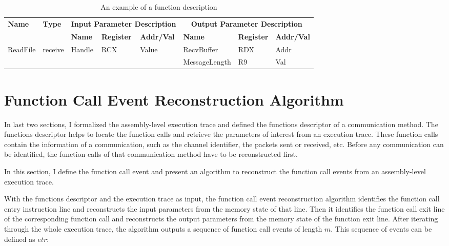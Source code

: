 \begin{table}[H]
        \centering
        \caption{An example of a function description}
        \label{functionexample}
        \begin{tabular}{|l|l|l|l|l|l|l|l|}
            \hline
             \multirow{2}{*}{{\textbf{Name}}} & \multirow{2}{*}{{\textbf{Type}}} & \multicolumn{3}{c|}{\textbf{Input Parameter Description}} & \multicolumn{3}{c|}{\textbf{Output Parameter Description}} \\
              \cline{3-8} 
             & & \textbf{Name}& \textbf{Register} &  \textbf{Addr/Val} & \textbf{Name}& \textbf{Register} &  \textbf{Addr/Val}  \\
             \hline
             \multirow{2}{*}{ReadFile}
             &\multirow{2}{*}{receive} &  \multirow{2}{*}{Handle} & \multirow{2}{*}{RCX} & \multirow{2}{*}{Value} & RecvBuffer & RDX  & Addr\\
              \cline{6-8} 
             & & & & & MessageLength & R9  & Val\\
            \hline            
        \end{tabular}
    \end{table}

\section{Function Call Event Reconstruction Algorithm}
In last two sections, I formalized the assembly-level execution trace and defined the functions descriptor of a communication method. The functions descriptor helps to locate the function calls and retrieve the parameters of interest from an execution trace. These function calls contain the information of a communication, such as the channel identifier, the packets sent or received, etc. Before any communication can be identified, the function calls of that communication method have to be reconstructed first. 

In this section, I define the function call event and present an algorithm to reconstruct the function call events from an assembly-level execution trace. 

With the functions descriptor and the execution trace as input, the function call event reconstruction algorithm identifies the function call entry instruction line and reconstructs the input parameters from the memory state of that line. Then it identifies the function call exit line of the corresponding function call and reconstructs the output parameters from the memory state of the function exit line. After iterating through the whole execution trace, the algorithm outputs a sequence of function call events of length $m$. This sequence of events can be defined as $etr$:

